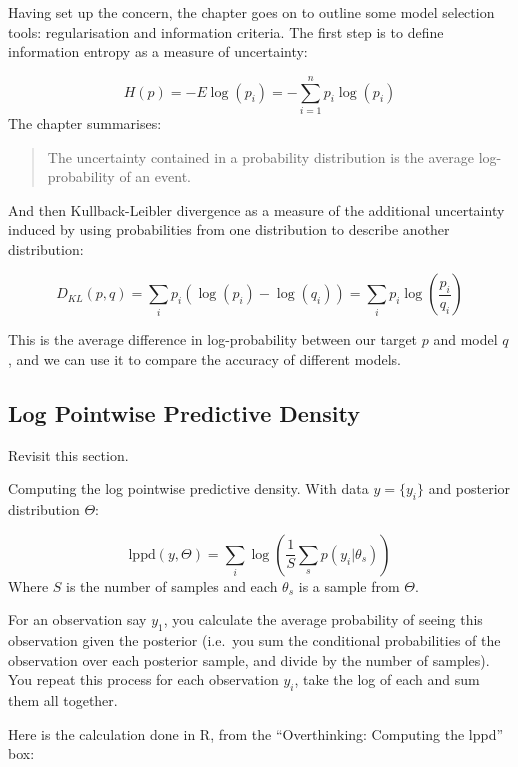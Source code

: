 \documentclass[
]{book}
\begin{document}
Having set up the concern, the chapter goes on to outline some model selection tools: regularisation and information criteria. The first step is to define information entropy as a measure of uncertainty:

\[
H(p) = -E\log(p_i) = -\sum_{i=1}^n p_i \log(p_i)
\]
The chapter summarises:

\begin{quote}
The uncertainty contained in a probability distribution is the average log-probability of an event.
\end{quote}

And then Kullback-Leibler divergence as a measure of the additional uncertainty induced by using probabilities from one distribution to describe another distribution:

\[
D_{KL}(p,q) = \sum_{i} p_i ( \log(p_i) - \log(q_i))= \sum_{i} p_i  \log(\frac{p_i}{q_i}) 
\]

This is the average difference in log-probability between our target \(p\) and model \(q\), and we can use it to compare the accuracy of different models.

\hypertarget{log-pointwise-predictive-density}{%
\subsection*{Log Pointwise Predictive Density}\label{log-pointwise-predictive-density}}

Revisit this section.

Computing the log pointwise predictive density. With data \(y = \{y_i\}\) and posterior distribution \(\Theta\):

\[
\text{lppd}(y,\Theta) = \sum_i \log \left( \frac{1}{S}\sum_s p(y_i | \theta_s) \right)
\]
Where \(S\) is the number of samples and each \(\theta_s\) is a sample from \(\Theta\).

For an observation say \(y_1\), you calculate the average probability of seeing this observation given the posterior (i.e.~you sum the conditional probabilities of the observation over each posterior sample, and divide by the number of samples). You repeat this process for each observation \(y_i\), take the log of each and sum them all together.

Here is the calculation done in R, from the ``Overthinking: Computing the lppd'' box:
\end{document}
